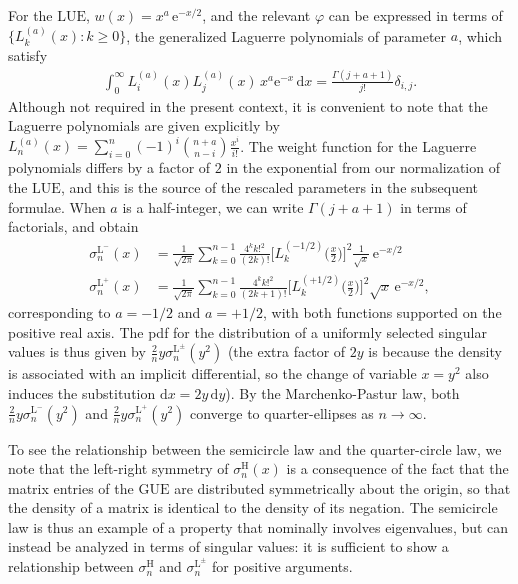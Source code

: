\documentclass[pdftex, oneside, 10pt, letterpaper]{amsart}
\theoremstyle{plain}
\theoremstyle{definition}
\theoremstyle{remark}
\begin{document}
For the {\ensuremath{\mathrm{LUE}}}{}, $w(x)=x^a\,\mathrm{e}^{-x/2}$, and the relevant
$\varphi$ can be expressed in terms of
$\{L_k^{(a)}(x)\colon{}k\geq0\}$, the generalized Laguerre polynomials
of parameter $a$, which satisfy
\begin{align*}
  \int_0^{\infty} L_i^{(a)}(x)L_j^{(a)}(x)\,
  x^{a}\mathrm{e}^{-x}\,\mathrm{d}x = \frac{\Gamma(j+a+1)}{j!} \delta_{i,j}.
\end{align*}
Although not required in the present context, it is convenient to note
that the Laguerre polynomials are given explicitly by
$L^{(a)}_n(x)=\sum_{i=0}^n(-1)^i\binom{n+a}{n-i}\frac{x^i}{i!}$.  The
weight function for the Laguerre polynomials differs by a factor of
$2$ in the exponential from our normalization of the {\ensuremath{\mathrm{LUE}}}{}, and this
is the source of the rescaled parameters in the subsequent formulae.
When $a$ is a half-integer, we can write $\Gamma(j+a+1)$ in terms of
factorials, and obtain
\begin{align*}
\sigma_{n}^{\mathrm{L}^-}(x)&=
          \frac{1}{\sqrt{2\pi}}
          \sum_{k=0}^{n-1}\frac{4^kk!^2}{(2k)!}
          \Big[L_k^{(-1/2)}\big(\frac{x}{2}\big)\Big]^2\frac{1}{\sqrt{x}}\,\mathrm{e}^{-x/2}\\
\sigma_{n}^{\mathrm{L}^+}(x)&=
          \frac{1}{\sqrt{2\pi}}
          \sum_{k=0}^{n-1}\frac{4^kk!^2}{(2k+1)!}
          \Big[L_k^{(+1/2)}\big(\frac{x}{2}\big)\Big]^2\sqrt{x}\,\mathrm{e}^{-x/2},
\end{align*}
corresponding to $a=-1/2$ and $a=+1/2$, with both functions supported
on the positive real axis.  The pdf for the distribution of a
uniformly selected singular values is thus given by
$\frac{2}{n}y\sigma_n^{\mathrm{L}^\pm}(y^2)$ (the extra factor of $2y$
is because the density is associated with an implicit differential, so
the change of variable $x=y^2$ also induces the substitution
$\mathrm{d}x=2y\,\mathrm{d}y$).  By the Marchenko-Pastur law, both
$\frac{2}{n}y\sigma_n^{\mathrm{L}^-}(y^2)$ and
$\frac{2}{n}y\sigma_n^{\mathrm{L}^+}(y^2)$ converge to
quarter-ellipses as $n\to\infty$.

To see the relationship between the semicircle law and the
quarter-circle law, we note that the left-right symmetry of
$\sigma_n^{\mathrm{H}}(x)$ is a consequence of the fact that the
matrix entries of the {\ensuremath{\mathrm{GUE}}}{} are distributed symmetrically about the
origin, so that the density of a matrix is identical to the density of
its negation.  The semicircle law is thus an example of a property
that nominally involves eigenvalues, but can instead be analyzed in
terms of singular values: it is sufficient to show a relationship
between $\sigma_{n}^{\mathrm{H}}$ and $\sigma_n^{\mathrm{L}^{\pm}}$
for positive arguments. 
\end{document}
